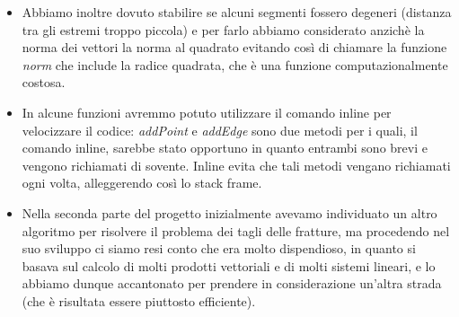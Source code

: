 \begin{itemize}
    \item Abbiamo inoltre dovuto stabilire se alcuni segmenti fossero degeneri (distanza tra gli estremi troppo piccola) e per farlo abbiamo considerato anzichè la norma dei vettori la norma al quadrato evitando così di chiamare la funzione \textit{norm} che include la radice quadrata, che è una funzione computazionalmente costosa.
    \item In alcune funzioni avremmo potuto utilizzare il comando inline per velocizzare il codice: \textit{addPoint} e \textit{addEdge} sono due metodi per i quali, il comando inline, sarebbe stato opportuno in quanto entrambi sono brevi e vengono richiamati di sovente. \newline Inline evita che tali metodi vengano richiamati ogni volta, alleggerendo così lo stack frame.
    \item Nella seconda parte del progetto inizialmente avevamo individuato un altro algoritmo per risolvere il problema dei tagli delle fratture, ma procedendo nel suo sviluppo ci siamo resi conto che era molto dispendioso, in quanto si basava sul calcolo di molti prodotti vettoriali e di molti sistemi lineari, e lo abbiamo dunque accantonato per prendere in considerazione un'altra strada (che è risultata essere piuttosto efficiente).
 
\end{itemize}
